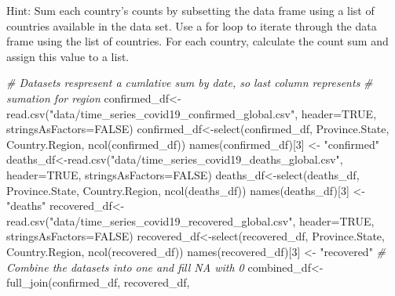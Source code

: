 \documentclass[
]{article}
\newenvironment{Shaded}{\begin{snugshade}}{\end{snugshade}}
\newcommand{\AttributeTok}[1]{\textcolor[rgb]{0.77,0.63,0.00}{#1}}
\newcommand{\CommentTok}[1]{\textcolor[rgb]{0.56,0.35,0.01}{\textit{#1}}}
\newcommand{\ConstantTok}[1]{\textcolor[rgb]{0.00,0.00,0.00}{#1}}
\newcommand{\DecValTok}[1]{\textcolor[rgb]{0.00,0.00,0.81}{#1}}
\newcommand{\FunctionTok}[1]{\textcolor[rgb]{0.00,0.00,0.00}{#1}}
\newcommand{\NormalTok}[1]{#1}
\newcommand{\OtherTok}[1]{\textcolor[rgb]{0.56,0.35,0.01}{#1}}
\newcommand{\StringTok}[1]{\textcolor[rgb]{0.31,0.60,0.02}{#1}}
\begin{document}
Hint: Sum each country's counts by subsetting the data frame using a
list of countries available in the data set. Use a for loop to iterate
through the data frame using the list of countries. For each country,
calculate the count sum and assign this value to a list.

\begin{Shaded}
\begin{Highlighting}[]
\CommentTok{\# Datasets respresent a cumlative sum by date, so last column represents }
\CommentTok{\# sumation for region}
\NormalTok{confirmed\_df}\OtherTok{\textless{}{-}}\FunctionTok{read.csv}\NormalTok{(}\StringTok{"data/time\_series\_covid19\_confirmed\_global.csv"}\NormalTok{, }
                       \AttributeTok{header=}\ConstantTok{TRUE}\NormalTok{, }\AttributeTok{stringsAsFactors=}\ConstantTok{FALSE}\NormalTok{)}
\NormalTok{confirmed\_df}\OtherTok{\textless{}{-}}\FunctionTok{select}\NormalTok{(confirmed\_df, Province.State, }
\NormalTok{                     Country.Region, }\FunctionTok{ncol}\NormalTok{(confirmed\_df))}
\FunctionTok{names}\NormalTok{(confirmed\_df)[}\DecValTok{3}\NormalTok{] }\OtherTok{\textless{}{-}} \StringTok{"confirmed"}
\NormalTok{deaths\_df}\OtherTok{\textless{}{-}}\FunctionTok{read.csv}\NormalTok{(}\StringTok{"data/time\_series\_covid19\_deaths\_global.csv"}\NormalTok{, }
                    \AttributeTok{header=}\ConstantTok{TRUE}\NormalTok{, }\AttributeTok{stringsAsFactors=}\ConstantTok{FALSE}\NormalTok{)}
\NormalTok{deaths\_df}\OtherTok{\textless{}{-}}\FunctionTok{select}\NormalTok{(deaths\_df, Province.State, }
\NormalTok{                  Country.Region, }\FunctionTok{ncol}\NormalTok{(deaths\_df))}
\FunctionTok{names}\NormalTok{(deaths\_df)[}\DecValTok{3}\NormalTok{] }\OtherTok{\textless{}{-}} \StringTok{"deaths"}
\NormalTok{recovered\_df}\OtherTok{\textless{}{-}}\FunctionTok{read.csv}\NormalTok{(}\StringTok{"data/time\_series\_covid19\_recovered\_global.csv"}\NormalTok{, }
                       \AttributeTok{header=}\ConstantTok{TRUE}\NormalTok{, }\AttributeTok{stringsAsFactors=}\ConstantTok{FALSE}\NormalTok{)}
\NormalTok{recovered\_df}\OtherTok{\textless{}{-}}\FunctionTok{select}\NormalTok{(recovered\_df, Province.State, }
\NormalTok{                     Country.Region, }\FunctionTok{ncol}\NormalTok{(recovered\_df))}
\FunctionTok{names}\NormalTok{(recovered\_df)[}\DecValTok{3}\NormalTok{] }\OtherTok{\textless{}{-}} \StringTok{"recovered"}
\CommentTok{\# Combine the datasets into one and fill NA with 0}
\NormalTok{combined\_df}\OtherTok{\textless{}{-}}\FunctionTok{full\_join}\NormalTok{(confirmed\_df, recovered\_df, }

\end{Highlighting}
\end{Shaded}
\end{document}
